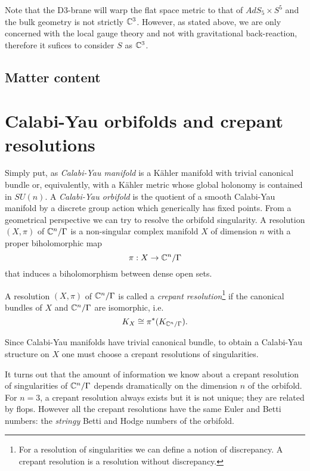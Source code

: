 \documentclass[a4paper,11pt]{article}
\begin{document}
        Note that the D$3$-brane will warp the flat space metric to that of $AdS_5\times S^5$ and the bulk geometry is not strictly $\mathbb{C}^3$. However, as stated above, we are only concerned with the local gauge theory and not with gravitational back-reaction, therefore it sufices to consider $S$ as $\mathbb{C}^3$.

    \subsection{Matter content}




\pagebreak
\appendix

\section{Calabi-Yau orbifolds and crepant resolutions}

    Simply put, as \emph{Calabi-Yau manifold} is a Kähler manifold with trivial canonical bundle or, equivalently, with a Kähler metric whose global holonomy is contained in $SU(n)$. A \emph{Calabi-Yau orbifold} is the quotient of a smooth Calabi-Yau manifold by a discrete group action which generically has fixed points. From a geometrical perspective we can try to resolve the orbifold singularity. A resolution $(X,\pi)$ of $\mathbb{C}^n/\Gamma$ is a non-singular complex manifold $X$ of dimension $n$ with a proper biholomorphic map 
    \begin{equation}
        \pi:X\to\mathbb{C}^n/\Gamma
    \end{equation}
    that induces a biholomorphism between dense open sets. 
    \begin{defn}
        A resolution $(X,\pi)$ of $\mathbb{C}^n/\Gamma$ is called a \emph{crepant resolution}\footnote{For a resolution of singularities we can define a notion of discrepancy. A crepant resolution is a resolution
        without discrepancy.} if the canonical bundles of $X$ and $\mathbb{C}^n/\Gamma$ are isomorphic, i.e.
        \begin{equation*}
            K_X\cong\pi^*(K_{\mathbb{C}^n/\Gamma}).
        \end{equation*}
    \end{defn}
    Since Calabi-Yau manifolds have trivial canonical bundle, to obtain a Calabi-Yau structure on $X$ one must choose a crepant resolutions of singularities.

    It turns out that the amount of information we know about a crepant resolution of singularities of $\mathbb{C}^n/\Gamma$ depends dramatically on the dimension $n$ of the orbifold. For $n=3$, a crepant resolution always exists but it is not unique; they are related by flops. However all the crepant resolutions have the same Euler and Betti numbers: the \emph{stringy} Betti and Hodge numbers of the orbifold.
   

\pagebreak

\listofmarker
{}

\pagebreak

\printbibliography
\end{document}
